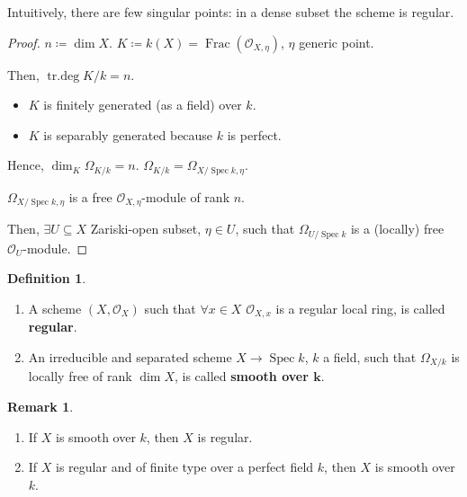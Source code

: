 \documentclass[12pt]{article}
\DeclareMathOperator{\Spec}{Spec}
\DeclareMathOperator{\Frac}{Frac}
\DeclareMathOperator{\trdeg}{tr.deg}
\theoremstyle{definition}
\newtheorem*{definition}{Definition}
\newtheorem*{remark}{Remark}
\begin{document}
Intuitively, there are few singular points: in a dense subset the scheme is regular.

\begin{proof}
$n\coloneqq\dim X$. $K\coloneqq k(X)=\Frac(\mathcal O_{X,\eta})$, $\eta$ generic point.

Then, $\trdeg K/k=n$.

\begin{itemize}[label=$-$]
\item $K$ is finitely generated (as a field) over $k$.

\item $K$ is separably generated because $k$ is perfect.
\end{itemize}

Hence, $\dim_K\Omega_{K/k}=n$. $\Omega_{K/k}=\Omega_{X/\Spec k,\eta}$.

$\Omega_{X/\Spec k,\eta}$ is a free $\mathcal O_{X,\eta}$-module of rank $n$.

Then, $\exists U\subseteq X$ Zariski-open subset, $\eta\in U$, such that $\Omega_{U/\Spec k}$ is a (locally) free $\mathcal O_U$-module.
\end{proof}

\begin{definition}
\begin{enumerate}[label=\arabic*)]
\item A scheme $(X,\mathcal O_X)$ such that $\forall x\in X$ $\mathcal O_{X,x}$ is a regular local ring, is called \textbf{regular}.

\item An irreducible and separated scheme $X\rightarrow\Spec k$, $k$ a field, such that $\Omega_{X/k}$ is locally free of rank $\dim X$, is called \textbf{smooth over $\boldsymbol k$}.
\end{enumerate}
\end{definition}

\begin{remark}
\begin{enumerate}[label=\arabic*)]
\item If $X$ is smooth over $k$, then $X$ is regular.

\item If $X$ is regular and of finite type over a perfect field $k$, then $X$ is smooth over $k$.
\end{enumerate}
\end{remark}
\end{document}

